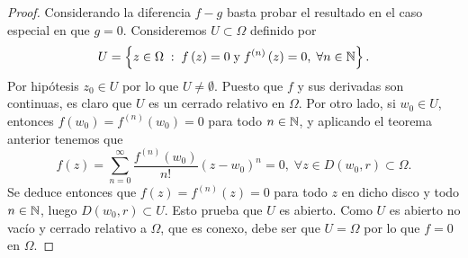 \begin{proof}
Considerando la diferencia $\displaystyle f - g $ basta probar el resultado en el caso especial en que $\displaystyle g = 0 $. Consideremos $\displaystyle U \subset \Omega  $ definido por
\[U = \left\{ z \in \Omega \; : \; f\left(z\right) = 0 \; \text{y} \; f^{\left(n\right)}\left(z\right)=0, \; \forall n \in \mathbb{N}\right\}  .\]
Por hipótesis $\displaystyle z_{0}\in U $ por lo que $\displaystyle U \neq \emptyset $. Puesto que $\displaystyle f $ y sus derivadas son continuas, es claro que $\displaystyle U $ es un cerrado relativo en $\displaystyle \Omega  $. Por otro lado, si $\displaystyle w_{0}\in U $, entonces $\displaystyle f\left(w_{0}\right)=f^{\left(n\right)}\left(w_{0}\right)=0 $ para todo $\displaystyle n \in \mathbb{N} $, y aplicando el teorema anterior tenemos que
\[f\left(z\right)=\sum^{\infty}_{n = 0}\frac{f^{\left(n\right)}\left(w_{0}\right)}{n!}\left(z-w_{0}\right)^{n} = 0 ,\; \forall z \in D\left(w_{0}, r\right)\subset \Omega .\]
Se deduce entonces que $\displaystyle f\left(z\right)=f^{\left(n\right)}\left(z\right)=0 $ para todo $\displaystyle z $ en dicho disco y todo $\displaystyle n \in \mathbb{N} $, luego $\displaystyle D\left(w_{0}, r\right)\subset U $. Esto prueba que $\displaystyle U $ es abierto. Como $\displaystyle U $ es abierto no vacío y cerrado relativo a $\displaystyle \Omega  $, que es conexo, debe ser que $\displaystyle U = \Omega  $ por lo que $\displaystyle f = 0 $ en $\displaystyle \Omega  $. 
\end{proof}
